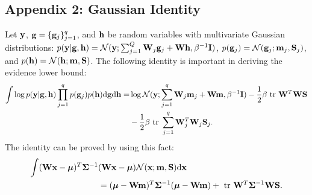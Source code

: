 \subsection{Appendix 2: Gaussian Identity}
Let $\mathbf{y}$, $\mathbf{g} = \{\mathbf{g}_j\}_{j=1}^q$, and $\mathbf{h}$ be random variables with multivariate Gaussian distributions: 
$p(\mathbf{y} | \mathbf{g}, \mathbf{h}) = \mathcal{N}(\mathbf{y}; \sum_{j=1}^Q \mathbf{W}_j \mathbf{g}_j + \mathbf{W} \mathbf{h}, \beta^{-1} \mathbf{I})$, $p(\mathbf{g}_j) = \mathcal{N}(\mathbf{g}_j; \mathbf{m}_j, \mathbf{S}_j)$, and $p(\mathbf{h}) = \mathcal{N}(\mathbf{h}; \mathbf{m}, \mathbf{S})$.
The following identity is important in deriving the evidence lower bound:
\begin{align}
\nonumber
\int \log p(\y | \g, \h) \prod_{j=1}^q p(\g_j) p(\h) \der \g \der \h
=& \log \Normal(\y; \sum_{j=1}^q \W_j \m_j + \W \m, \beta^{-1} \I) - \frac{1}{2} \beta \trace \W^T \W \S \\
\label{eq:identity}
&- \frac{1}{2} \beta \trace \sum_{j=1}^q \W_j^T \W_j \S_j.
\end{align}
The identity can be proved by using this fact: 
\begin{align}
\nonumber
\int (\mathbf{W}\mathbf{x} - \boldsymbol{\mu})^T \mathbf{\Sigma}^{-1} &(\mathbf{W} \mathbf{x} - \boldsymbol{\mu}) \mathcal{N}(\mathbf{x}; \mathbf{m}, \mathbf{S}) \mathrm{d} \mathbf{x} \\
\nonumber
&= (\boldsymbol{\mu} - \mathbf{W}\mathbf{m})^T \mathbf{\Sigma}^{-1} (\boldsymbol{\mu} - \mathbf{W}\mathbf{m}) + \mbox{ \rm tr } \mathbf{W}^T \mathbf{\Sigma}^{-1} \mathbf{W} \mathbf{S}.
\end{align}

